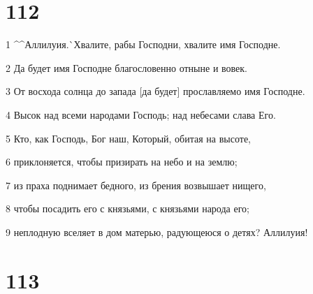 \chapter{112}

\par 1 ^^Аллилуия.^^ Хвалите, рабы Господни, хвалите имя Господне.
\par 2 Да будет имя Господне благословенно отныне и вовек.
\par 3 От восхода солнца до запада [да будет] прославляемо имя Господне.
\par 4 Высок над всеми народами Господь; над небесами слава Его.
\par 5 Кто, как Господь, Бог наш, Который, обитая на высоте,
\par 6 приклоняется, чтобы призирать на небо и на землю;
\par 7 из праха поднимает бедного, из брения возвышает нищего,
\par 8 чтобы посадить его с князьями, с князьями народа его;
\par 9 неплодную вселяет в дом матерью, радующеюся о детях? Аллилуия!

\chapter{113}


